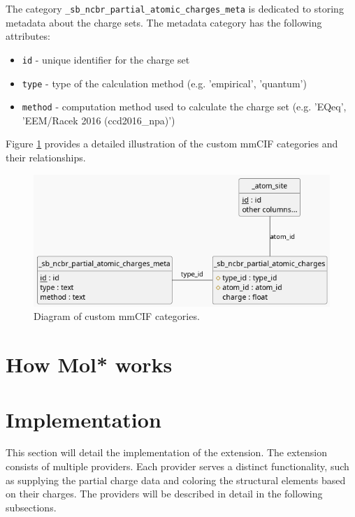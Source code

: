 \documentclass[
  digital,     %
  oneside,     %
  nosansbold,  %
  nocolorbold, %
  lof,         %
  lot,         %
]{fithesis4}
\begin{document}
The category \texttt{\_sb\_ncbr\_partial\_atomic\_charges\_meta} is dedicated to storing metadata about the charge sets. The metadata category has the following attributes:

\begin{itemize}
  \item \texttt{id} - unique identifier for the charge set
  \item \texttt{type} - type of the calculation method (e.g. 'empirical', 'quantum')
  \item \texttt{method} - computation method used to calculate the charge set (e.g. 'EQeq', 'EEM/Racek 2016 (ccd2016\_npa)')
\end{itemize}

Figure \ref{fig:mmcif_erd} provides a detailed illustration of the custom mmCIF categories and their relationships.

\begin{figure}
  \begin{center}
    \includegraphics[width=12cm]{figures/mmcif_erd.png}
  \end{center}
  \caption{Diagram of custom mmCIF categories.}
  \label{fig:mmcif_erd}
\end{figure}

\section{How Mol* works}

\section{Implementation}
\label{section:implementation}

This section will detail the implementation of the extension. The extension consists of multiple providers. Each provider serves a distinct functionality, such as supplying the partial charge data and coloring the structural elements based on their charges. The providers will be described in detail in the following subsections.
\end{document}
